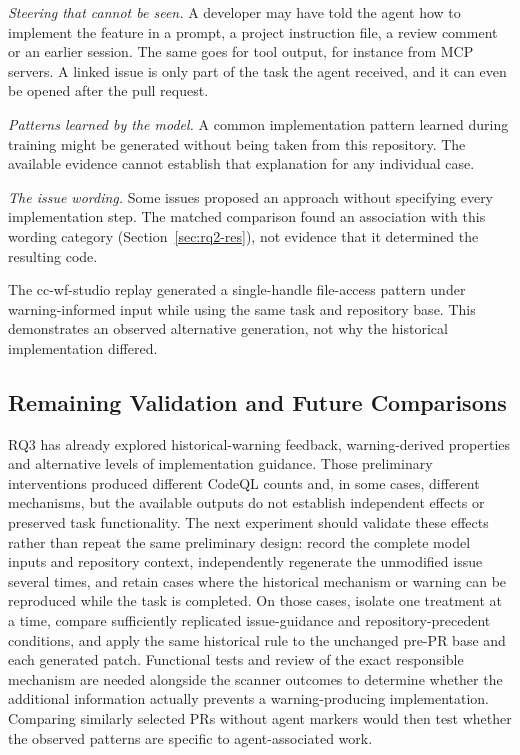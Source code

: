 \documentclass[acmsmall,screen,nonacm]{acmart}
\begin{document}
\emph{Steering that cannot be seen.} A developer may have told the agent how to implement the feature in a prompt, a project instruction file, a review comment or an earlier session. The same goes for tool output, for instance from MCP servers. A linked issue is only part of the task the agent received, and it can even be opened after the pull request.

\emph{Patterns learned by the model.} A common implementation pattern learned during training might be generated without being taken from this repository. The available evidence cannot establish that explanation for any individual case.

\emph{The issue wording.} Some issues proposed an approach without specifying every implementation step. The matched comparison found an association with this wording category (Section~\ref{sec:rq2-res}), not evidence that it determined the resulting code.

The cc-wf-studio replay generated a single-handle file-access pattern under warning-informed input while using the same task and repository base. This demonstrates an observed alternative generation, not why the historical implementation differed.


\subsection{Remaining Validation and Future Comparisons}

RQ3 has already explored historical-warning feedback, warning-derived properties and alternative levels of implementation guidance. Those preliminary interventions produced different CodeQL counts and, in some cases, different mechanisms, but the available outputs do not establish independent effects or preserved task functionality. The next experiment should validate these effects rather than repeat the same preliminary design: record the complete model inputs and repository context, independently regenerate the unmodified issue several times, and retain cases where the historical mechanism or warning can be reproduced while the task is completed. On those cases, isolate one treatment at a time, compare sufficiently replicated issue-guidance and repository-precedent conditions, and apply the same historical rule to the unchanged pre-PR base and each generated patch. Functional tests and review of the exact responsible mechanism are needed alongside the scanner outcomes to determine whether the additional information actually prevents a warning-producing implementation. Comparing similarly selected PRs without agent markers would then test whether the observed patterns are specific to agent-associated work.
\end{document}
